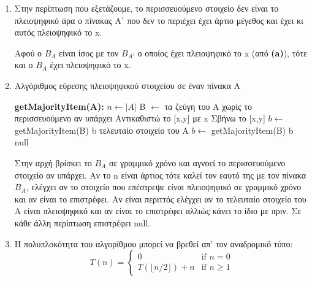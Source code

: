 \documentclass[a4paper,10pt]{article}
\begin{document}
\begin{flushleft}
\begin{enumerate}
        \item Στην περίπτωση που εξετάζουμε, το περισσευούμενο στοιχείο δεν είναι το πλειοψηφικό άρα ο πίνακας Α΄ που δεν το περιέχει έχει άρτιο μέγεθος και έχει κι αυτός πλειοψηφικό το x.
        
        Αφού ο $B_A$ είναι ίσος με τον $B_{A'}$ ο οποίος έχει πλειοψηφικό το x (από \textbf{(a)}), τότε και ο $B_A$ έχει πλειοψηφικό το x.

        \item     
        \begin{algorithm}[H]
            \caption*{Αλγόριθμος εύρεσης πλειοψηφικού στοιχείου σε έναν πίνακα Α}
    
            \begin{algorithmic}[1]
            \STATE \textbf{getMajorityItem(A):}
            \STATE
            \STATE $n \gets |A|$
            \STATE Β $\gets $ τα ζεύγη του Α χωρίς το περισσευούμενο αν υπάρχει
                    \STATE Αντικαθιστώ το [x,y] με x
                \ELSE
                    \STATE Σβήνω το [x,y]
                \ENDIF
            \ENDFOR
            \STATE
                    \STATE $b \gets $ getMajorityItem(B)
                        \RETURN b
                    \ENDIF
                    \RETURN τελευταίο στοιχείο του Α
                \ELSE 
                    \STATE $b \gets $ getMajorityItem(Β)
                        \RETURN b
                    \ENDIF
                \ENDIF
            \ENDIF
            \STATE
            \RETURN null
            
            
            \end{algorithmic}
        \end{algorithm}

        Στην αρχή βρίσκει το $B_A$ σε γραμμικό χρόνο και αγνοεί το περισσευούμενο στοιχείο αν υπάρχει. Αν το n είναι άρτιος τότε καλεί τον εαυτό της με τον πίνακα $B_A$, ελέγχει αν το στοιχείο που επέστρεψε είναι πλειοψηφικό σε γραμμικό χρόνο και αν είναι το επιστρέφει. Αν είναι περιττός ελέγχει αν το τελευταίο στοιχείο του Α είναι πλειοψηφικό και αν είναι το επιστρέφει αλλιώς κάνει το ίδιο με πριν. Σε κάθε άλλη περίπτωση επιστρέφει null.

        \item Η πολυπλοκότητα του αλγορίθμου μπορεί να βρεθεί απ' τον αναδρομικό τύπο:
        \begin{equation*}
            T(n) = 
            \begin{cases}
            0 & \text{if } n = 0 \\
            T(\lfloor n/2 \rfloor) + n & \text{if } n \geq 1
            \end{cases}
        \end{equation*}


\end{enumerate}
\end{flushleft}
\end{document}
